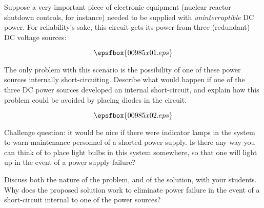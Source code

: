 

Suppose a very important piece of electronic equipment (nuclear reactor shutdown controls, for instance) needed to be supplied with {\it uninterruptible} DC power.  For reliability's sake, this circuit gets its power from three (redundant) DC voltage sources:

$$\epsfbox{00985x01.eps}$$

The only problem with this scenario is the possibility of one of these power sources internally short-circuiting.  Describe what would happen if one of the three DC power sources developed an internal short-circuit, and explain how this problem could be avoided by placing diodes in the circuit.







$$\epsfbox{00985x02.eps}$$

\vskip 10pt

Challenge question: it would be nice if there were indicator lamps in the system to warn maintenance personnel of a shorted power supply.  Is there any way you can think of to place light bulbs in this system somewhere, so that one will light up in the event of a power supply failure?







Discuss both the nature of the problem, and of the solution, with your students.  Why does the proposed solution work to eliminate power failure in the event of a short-circuit internal to one of the power sources?



